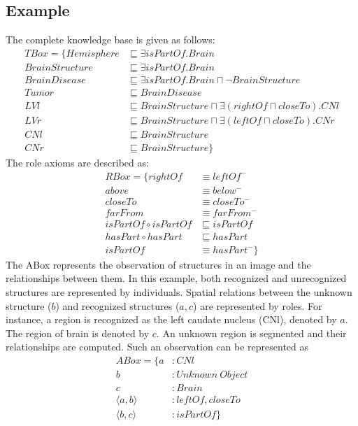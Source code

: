 \documentclass{article}
\begin{document}
\subsection{Example}
 The complete knowledge base is given as follows:
\begin{align*}
 TBox=\{ Hemisphere &\sqsubseteq \exists isPartOf. Brain\\
	 BrainStructure &\sqsubseteq \exists isPartOf. Brain\\
	 BrainDisease &\sqsubseteq \exists isPartOf. Brain \sqcap \neg BrainStructure\\
	 Tumor  &\sqsubseteq BrainDisease\\
	 LVl &\sqsubseteq BrainStructure \sqcap \exists (rightOf \sqcap closeTo). CNl\\
	 LVr &\sqsubseteq BrainStructure \sqcap \exists (leftOf \sqcap closeTo). CNr\\
	 CNl &\sqsubseteq BrainStructure\\
	 CNr &\sqsubseteq BrainStructure\}
\end{align*}
The role axioms are described as:
\begin{align*}
 RBox=\{ rightOf &\equiv leftOf^-\\
         above &\equiv below^- \\
	 closeTo &\equiv closeTo^- \\
	 farFrom &\equiv farFrom^- \\
	 isPartOf \circ isPartOf &\sqsubseteq isPartOf \\
	 hasPart \circ hasPart &\sqsubseteq hasPart\\
	 isPartOf &\equiv hasPart^-\}
\end{align*}
The ABox represents the observation of structures in an image and the relationships between them.
In this example, both recognized and unrecognized structures are represented by individuals. Spatial relations between the unknown structure ($b$) and
recognized structures ($a,c$) are represented by roles.
For instance, a region is recognized as the left caudate nucleus (CNl), denoted by $a$.
The region of brain is denoted by $c$. An unknown region is segmented and their relationships are computed.  
Such an observation can be represented as
\begin{align*}
 ABox=\{ a&: CNl \\
	 b&: Unknown~Object \\
	 c&: Brain \\
	 \langle a,b\rangle &: leftOf, closeTo \\
	 \langle b,c\rangle &: isPartOf\}
\end{align*}
\end{document}
